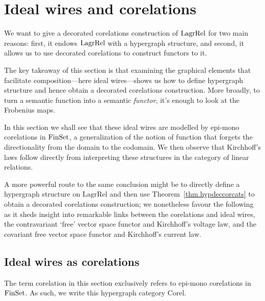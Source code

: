 \section{Ideal wires and corelations} \label{sec:corel}
We want to give a decorated corelations construction of $\mathrm{LagrRel}$ for two main
reasons: first, it endows $\mathrm{LagrRel}$ with a hypergraph structure, and second, it
allows us to use decorated corelations to construct functors to it.  

The key takeaway of this section is that examining the graphical elements that
facilitate composition---here ideal wires---shows us how to define hypergraph
structure and hence obtain a decorated corelations construction. More broadly,
to turn a semantic function into a semantic \emph{functor}, it's enough to look
at the Frobenius maps.

In this section we shall see that these ideal wires are modelled by epi-mono
corelations in $\mathrm{FinSet}$, a generalization of the notion of function that
forgets the directionality from the domain to the codomain. We then observe
that Kirchhoff's laws follow directly from interpreting these structures in the
category of linear relations.

A more powerful route to the same conclusion might be to directly define a
hypergraph structure on $\mathrm{LagrRel}$ and then use
Theorem~\ref{thm.hypdeccorcats} to obtain a decorated corelations construction;
we nonetheless favour the following as it sheds insight into remarkable links
between the corelations and ideal wires, the contravariant `free' vector space
functor and Kirchhoff's voltage law, and the covariant free vector space functor
and Kirchhoff's current law. 

\subsection{Ideal wires as corelations}

The term corelation in this section exclusively refers to epi-mono corelations
in $\mathrm{FinSet}$. As such, we write this hypergraph category $\mathrm{Corel}$. 

